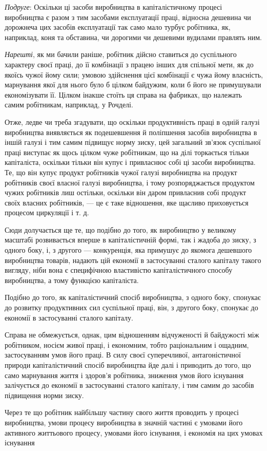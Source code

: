 
\emph{Подруге}: Оскільки ці засоби виробництва в капіталістичному
процесі виробництва є разом з тим засобами експлуатації праці,
відносна дешевина чи дорожнеча цих засобів експлуатації так
само мало турбує робітника, як, наприклад, коня та обставина,
чи дорогими чи дешевими вудилами правлять ним.

\emph{Нарешті}, як ми бачили раніше, робітник дійсно ставиться
до суспільного характеру своєї праці, до її комбінації з працею
інших для спільної мети, як до якоїсь чужої йому сили; умовою
здійснення цієї комбінації є чужа йому власність, марнування
якої для нього було б цілком байдужим, коли б його не примушували
економізувати її. Цілком інакше стоїть ця справа
на фабриках, що належать самим робітникам, наприклад, у Рочделі.

Отже, ледве чи треба згадувати, що оскільки продуктивність
праці в одній галузі виробництва виявляється як подешевшення
й поліпшення засобів виробництва в іншій галузі і тим самим
підвищує норму зиску, цей загальний зв’язок суспільної праці
виступає як щось цілком чуже робітникам, що на ділі торкається
тільки капіталіста, оскільки тільки він купує і привласнює
собі ці засоби виробництва. Те, що він купує продукт робітників чужої галузі виробництва на продукт
робітників своєї власної галузі виробництва, і тому розпоряджається продуктом чужих робітників лиш
остільки, оскільки він даром привласнив собі продукт своїх власних робітників, — це є таке
відношення,
яке щасливо приховується процесом циркуляції і т. д.

Сюди долучається ще те, що подібно до того, як виробництво у великому масштабі розвивається вперше в
капіталістичній формі, так і жадоба до зиску, з одного боку, і, з другого — конкуренція, яка
примушує до якомога дешевшого виробництва товарів, надають цій економії в застосуванні сталого
капіталу такого вигляду, ніби вона є специфічною властивістю
капіталістичного способу виробництва, а тому функцією капіталіста.

Подібно до того, як капіталістичний спосіб виробництва,
з одного боку, спонукає до розвитку продуктивних сил суспільної праці, він, з другого боку, спонукає
до економії в застосуванні сталого капіталу.

Справа не обмежується, однак, цим відношенням відчуженості
й байдужості між робітником, носієм живої праці, і економним,
тобто раціональним і ощадним, застосуванням умов його праці.
В силу своєї суперечливої, антагоністичної природи капіталістичний спосіб виробництва йде далі і
приводить до того, що само
марнування життя і здоров’я робітника, зниження умов його
існування залічується до економії в застосуванні сталого капіталу, і тим самим до засобів підвищення
норми зиску.

Через те що робітник найбільшу частину свого життя проводить у процесі виробництва, умови процесу
виробництва
в значній частині є умовами його активного життьового процесу, умовами його існування, і економія на
цих умовах існування
\parbreak{}  %
